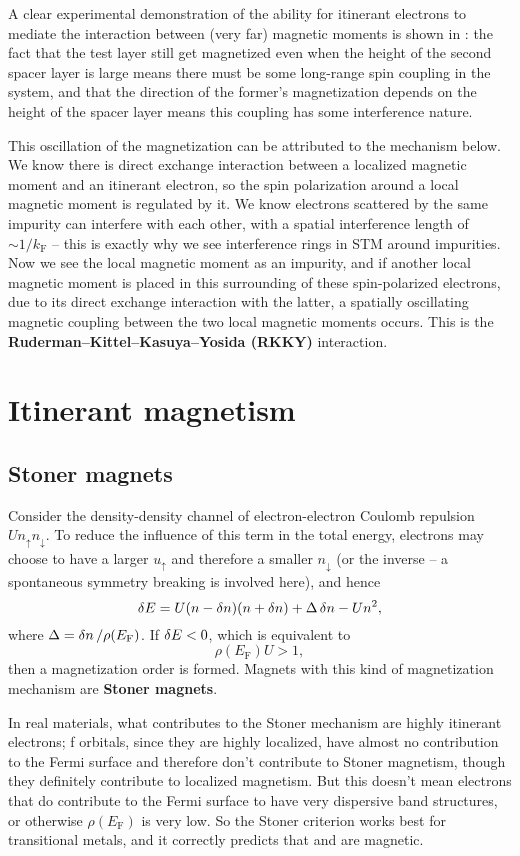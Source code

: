\documentclass[hyperref, a4paper]{article}
\newcommand*{\concept}[1]{{\textbf{#1}}}
\newcommand*{\efermi}{E_{\text{F}}}
\begin{document}
A clear experimental demonstration of the ability for itinerant electrons 
to mediate the interaction between (very far) magnetic moments 
is shown in :
the fact that the test layer still get magnetized 
even when the height of the second spacer layer is large 
means there must be some long-range spin coupling in the system,
and that the direction of the former's magnetization 
depends on the height of the spacer layer 
means this coupling has some interference nature. 

This oscillation of the magnetization can be attributed to the mechanism below.
We know there is direct exchange interaction 
between a localized magnetic moment and an itinerant electron, 
so the spin polarization around a local magnetic moment 
is regulated by it. 
We know electrons scattered by the same impurity can interfere with each other, 
with a spatial interference length of $\sim 1 / k_{\text{F}}$ -- 
this is exactly why we see interference rings in STM around impurities. 
Now we see the local magnetic moment as an impurity,
and if another local magnetic moment 
is placed in this surrounding of these spin-polarized electrons, 
due to its direct exchange interaction with the latter, 
a spatially oscillating magnetic coupling between the two local magnetic moments occurs. 
This is the \concept{Ruderman–Kittel–Kasuya–Yosida (RKKY)} interaction. 

\section{Itinerant magnetism}

\subsection{Stoner magnets}

Consider the density-density channel of electron-electron Coulomb repulsion $U n_\uparrow n_\downarrow$. 
To reduce the influence of this term in the total energy, 
electrons may choose to have a larger $u_\uparrow$ and therefore a smaller $n_{\downarrow}$
(or the inverse -- a spontaneous symmetry breaking is involved here),
and hence 
\begin{equation}
    \var{E} = U (n - \var{n}) (n + \var{n}) + \Delta \var{n} - U n^2,
\end{equation}
where $\Delta = \var{n} / \rho(\efermi)$.
If $\var{E} < 0$, which is equivalent to 
\begin{equation}
    \rho(\efermi) U > 1,
\end{equation}
then a magnetization order is formed. 
Magnets with this kind of magnetization mechanism 
are \concept{Stoner magnets}.

In real materials, 
what contributes to the Stoner mechanism 
are highly itinerant electrons;
f orbitals, since they are highly localized, 
have almost no contribution to the Fermi surface 
and therefore don't contribute to Stoner magnetism,
though they definitely contribute to localized magnetism.
But this doesn't mean electrons that do contribute to the Fermi surface 
to have very dispersive band structures,
or otherwise $\rho(\efermi)$ is very low. 
So the Stoner criterion works best for transitional metals, 
and it correctly predicts that  and  are magnetic.
\end{document}
